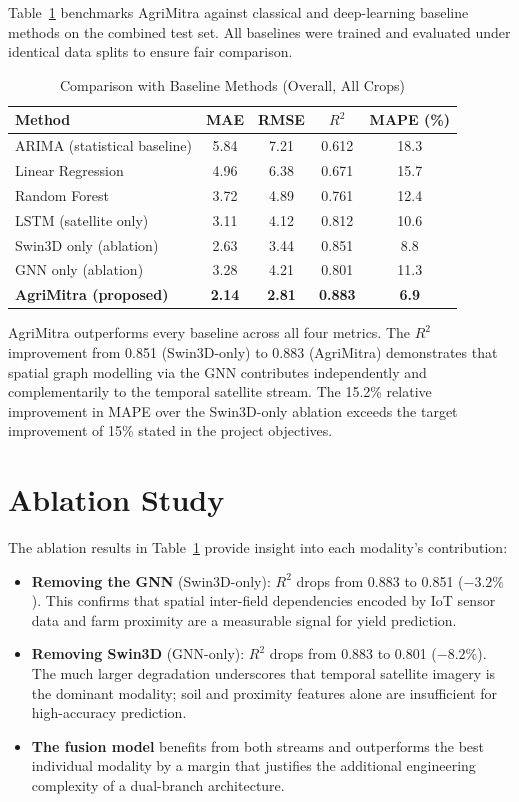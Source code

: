 Table~\ref{tab:comparison} benchmarks AgriMitra against classical and deep-learning baseline methods on the combined test set. All baselines were trained and evaluated under identical data splits to ensure fair comparison.

\begin{table}[h]
\centering
\caption{Comparison with Baseline Methods (Overall, All Crops)}
\label{tab:comparison}
\begin{tabular}{|l|c|c|c|c|}
\hline
\textbf{Method} & \textbf{MAE} & \textbf{RMSE} & \textbf{$R^2$} & \textbf{MAPE (\%)} \\
\hline
ARIMA (statistical baseline)   & 5.84 & 7.21 & 0.612 & 18.3 \\
Linear Regression              & 4.96 & 6.38 & 0.671 & 15.7 \\
Random Forest                  & 3.72 & 4.89 & 0.761 & 12.4 \\
LSTM (satellite only)          & 3.11 & 4.12 & 0.812 & 10.6 \\
Swin3D only (ablation)         & 2.63 & 3.44 & 0.851 &  8.8 \\
GNN only (ablation)            & 3.28 & 4.21 & 0.801 & 11.3 \\
\hline
\textbf{AgriMitra (proposed)}  & \textbf{2.14} & \textbf{2.81} & \textbf{0.883} & \textbf{6.9} \\
\hline
\end{tabular}
\end{table}

AgriMitra outperforms every baseline across all four metrics. The $R^2$ improvement from 0.851 (Swin3D-only) to 0.883 (AgriMitra) demonstrates that spatial graph modelling via the GNN contributes independently and complementarily to the temporal satellite stream. The 15.2\% relative improvement in MAPE over the Swin3D-only ablation exceeds the target improvement of 15\% stated in the project objectives.

\section{Ablation Study}

The ablation results in Table~\ref{tab:comparison} provide insight into each modality's contribution:
\begin{itemize}
    \item \textbf{Removing the GNN} (Swin3D-only): $R^2$ drops from 0.883 to 0.851 ($-3.2\%$). This confirms that spatial inter-field dependencies encoded by IoT sensor data and farm proximity are a measurable signal for yield prediction.
    \item \textbf{Removing Swin3D} (GNN-only): $R^2$ drops from 0.883 to 0.801 ($-8.2\%$). The much larger degradation underscores that temporal satellite imagery is the dominant modality; soil and proximity features alone are insufficient for high-accuracy prediction.
    \item \textbf{The fusion model} benefits from both streams and outperforms the best individual modality by a margin that justifies the additional engineering complexity of a dual-branch architecture.
\end{itemize}

